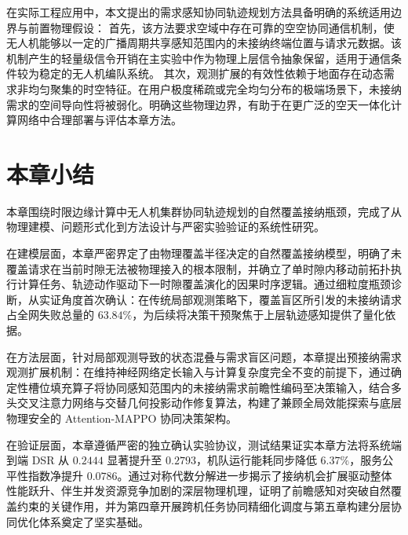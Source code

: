 在实际工程应用中，本文提出的需求感知协同轨迹规划方法具备明确的系统适用边界与前置物理假设：
首先，该方法要求空域中存在可靠的空空协同通信机制，使无人机能够以一定的广播周期共享感知范围内的未接纳终端位置与请求元数据。该机制产生的轻量级信令开销在主实验中作为物理上层信令抽象保留，适用于通信条件较为稳定的无人机编队系统。
其次，观测扩展的有效性依赖于地面存在动态需求非均匀聚集的时空特征。在用户极度稀疏或完全均匀分布的极端场景下，未接纳需求的空间导向性将被弱化。明确这些物理边界，有助于在更广泛的空天一体化计算网络中合理部署与评估本章方法。

\section{本章小结}
\label{sec:ch3-summary}

本章围绕时限边缘计算中无人机集群协同轨迹规划的自然覆盖接纳瓶颈，完成了从物理建模、问题形式化到方法设计与严密实验验证的系统性研究。

在建模层面，本章严密界定了由物理覆盖半径决定的自然覆盖接纳模型，明确了未覆盖请求在当前时隙无法被物理接入的根本限制，并确立了单时隙内移动前拓扑执行计算任务、轨迹动作驱动下一时隙覆盖演化的因果时序逻辑。通过细粒度瓶颈诊断，从实证角度首次确认：在传统局部观测策略下，覆盖盲区所引发的未接纳请求占全网失败总量的 $63.84\%$，为后续将决策干预聚焦于上层轨迹感知提供了量化依据。

在方法层面，针对局部观测导致的状态混叠与需求盲区问题，本章提出预接纳需求观测扩展机制：在维持神经网络定长输入与计算复杂度完全不变的前提下，通过确定性槽位填充算子将协同感知范围内的未接纳需求前瞻性编码至决策输入，结合多头交叉注意力网络与交替几何投影动作修复算法，构建了兼顾全局效能探索与底层物理安全的 Attention-MAPPO 协同决策架构。

在验证层面，本章遵循严密的独立确认实验协议，测试结果证实本章方法将系统端到端 DSR 从 $0.2444$ 显著提升至 $0.2793$，机队运行能耗同步降低 $6.37\%$，服务公平性指数净提升 $0.0786$。通过对称代数分解进一步揭示了接纳机会扩展驱动整体性能跃升、伴生并发资源竞争加剧的深层物理机理，证明了前瞻感知对突破自然覆盖约束的关键作用，并为第四章开展跨机任务协同精细化调度与第五章构建分层协同优化体系奠定了坚实基础。


